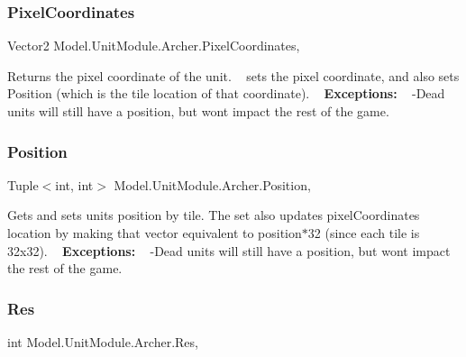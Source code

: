\subsubsection{\texorpdfstring{Pixel\+Coordinates}{PixelCoordinates}}
{\footnotesize\ttfamily Vector2 Model.\+Unit\+Module.\+Archer.\+Pixel\+Coordinates\hspace{0.3cm}{\ttfamily [get]}, {\ttfamily [set]}}

Returns the pixel coordinate of the unit. ~\newline
 sets the pixel coordinate, and also sets Position (which is the tile location of that coordinate). ~\newline
{\bfseries Exceptions\+:} ~\newline
 -\/\+Dead units will still have a position, but won\textquotesingle{}t impact the rest of the game. \hypertarget{class_model_1_1_unit_module_1_1_archer_a0038f1b30e38e431dee388f6fdf8b6d7}{}\label{class_model_1_1_unit_module_1_1_archer_a0038f1b30e38e431dee388f6fdf8b6d7} 
\subsubsection{\texorpdfstring{Position}{Position}}
{\footnotesize\ttfamily Tuple$<$int, int$>$ Model.\+Unit\+Module.\+Archer.\+Position\hspace{0.3cm}{\ttfamily [get]}, {\ttfamily [set]}}

Gets and sets unit\textquotesingle{}s position by tile. The set also updates pixel\+Coordinate\textquotesingle{}s location by making that vector equivalent to position$\ast$32 (since each tile is 32x32). ~\newline
 {\bfseries Exceptions\+:} ~\newline
 -\/\+Dead units will still have a position, but won\textquotesingle{}t impact the rest of the game. \hypertarget{class_model_1_1_unit_module_1_1_archer_ae930922325e02ed61ff2be93d8ee24b0}{}\label{class_model_1_1_unit_module_1_1_archer_ae930922325e02ed61ff2be93d8ee24b0} 
\subsubsection{\texorpdfstring{Res}{Res}}
{\footnotesize\ttfamily int Model.\+Unit\+Module.\+Archer.\+Res\hspace{0.3cm}{\ttfamily [get]}, {\ttfamily [set]}}

